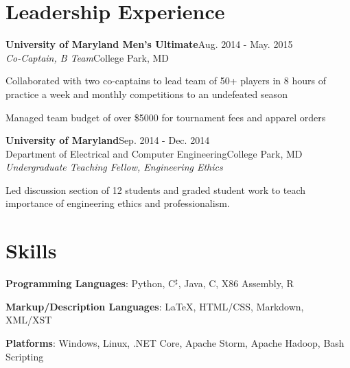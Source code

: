 \documentclass[letterpaper,12pt]{article}
\def \myrespresectionskip {-.25in}
\def \resumeitemizeskip{0in}
\def \jobskip{.075in}
\newcommand{\resheading}[5]{
\normalsize{\textbf{#1}}\hfill{\rmfamily\normalsize\textcolor{faded}{#2}} \\
\normalsize{#3}\hfill{\textcolor{faded}{\normalsize#4}}\\
\normalsize{#5}
\normalsize
}
\newcommand{\resitem}[1]{\item #1 \vspace{-2pt}}
\begin{document}
\section*{Leadership Experience}
\resheading{{University of Maryland Men's Ultimate}}{Aug. 2014 \-- May. 2015}{\emph{Co-Captain, B Team}}{College Park, MD}{}
   { \footnotesize
\vspace{-.2in}
      \begin{resumeitemize}
	\item{Collaborated with two co-captains to lead team of 50+ players in 8 hours of practice a week and monthly competitions to an undefeated season}
	\item{Managed team budget of over \$5000 for tournament fees and apparel orders}
          \end{resumeitemize}
}
\vspace{\jobskip}
\resheading{{University of Maryland}}{Sep. 2014 \-- Dec. 2014}{{Department of Electrical and Computer Engineering}}{College Park, MD}{\emph{Undergraduate Teaching Fellow, Engineering Ethics}}
   { \footnotesize
\vspace{\resumeitemizeskip}
      \begin{resumeitemize}
	\item{Led discussion section of 12 students and graded student work to teach importance of engineering ethics and professionalism.}
          \end{resumeitemize}
}
\vspace{\myrespresectionskip}
\section*{Skills}
\begin{skillsitemize}
\resitem{\textbf{Programming Languages}: Python, C$^\sharp$, Java, C, X86 Assembly, R}
\resitem{\textbf{Markup/Description Languages}: \LaTeX, HTML/CSS, Markdown, XML/XST}
\resitem{\textbf{Platforms}: Windows, Linux, .NET Core, Apache Storm, Apache Hadoop, Bash Scripting}
\end{skillsitemize}
\end{document}
